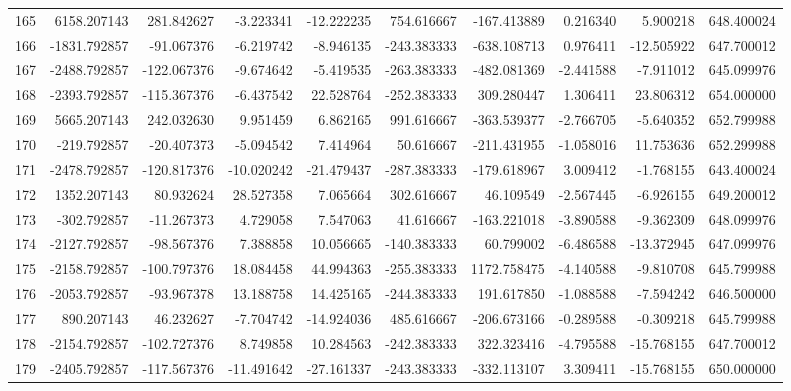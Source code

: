 \begin{tabular}{lrrrrrrrrr}
165 &   6158.207143 &   281.842627 &  -3.223341 & -12.222235 &   754.616667 &  -167.413889 &   0.216340 &   5.900218 &  648.400024 \\
166 &  -1831.792857 &   -91.067376 &  -6.219742 &  -8.946135 &  -243.383333 &  -638.108713 &   0.976411 & -12.505922 &  647.700012 \\
167 &  -2488.792857 &  -122.067376 &  -9.674642 &  -5.419535 &  -263.383333 &  -482.081369 &  -2.441588 &  -7.911012 &  645.099976 \\
168 &  -2393.792857 &  -115.367376 &  -6.437542 &  22.528764 &  -252.383333 &   309.280447 &   1.306411 &  23.806312 &  654.000000 \\
169 &   5665.207143 &   242.032630 &   9.951459 &   6.862165 &   991.616667 &  -363.539377 &  -2.766705 &  -5.640352 &  652.799988 \\
170 &   -219.792857 &   -20.407373 &  -5.094542 &   7.414964 &    50.616667 &  -211.431955 &  -1.058016 &  11.753636 &  652.299988 \\
171 &  -2478.792857 &  -120.817376 & -10.020242 & -21.479437 &  -287.383333 &  -179.618967 &   3.009412 &  -1.768155 &  643.400024 \\
172 &   1352.207143 &    80.932624 &  28.527358 &   7.065664 &   302.616667 &    46.109549 &  -2.567445 &  -6.926155 &  649.200012 \\
173 &   -302.792857 &   -11.267373 &   4.729058 &   7.547063 &    41.616667 &  -163.221018 &  -3.890588 &  -9.362309 &  648.099976 \\
174 &  -2127.792857 &   -98.567376 &   7.388858 &  10.056665 &  -140.383333 &    60.799002 &  -6.486588 & -13.372945 &  647.099976 \\
175 &  -2158.792857 &  -100.797376 &  18.084458 &  44.994363 &  -255.383333 &  1172.758475 &  -4.140588 &  -9.810708 &  645.799988 \\
176 &  -2053.792857 &   -93.967378 &  13.188758 &  14.425165 &  -244.383333 &   191.617850 &  -1.088588 &  -7.594242 &  646.500000 \\
177 &    890.207143 &    46.232627 &  -7.704742 & -14.924036 &   485.616667 &  -206.673166 &  -0.289588 &  -0.309218 &  645.799988 \\
178 &  -2154.792857 &  -102.727376 &   8.749858 &  10.284563 &  -242.383333 &   322.323416 &  -4.795588 & -15.768155 &  647.700012 \\
179 &  -2405.792857 &  -117.567376 & -11.491642 & -27.161337 &  -243.383333 &  -332.113107 &   3.309411 & -15.768155 &  650.000000 \\

\end{tabular}
